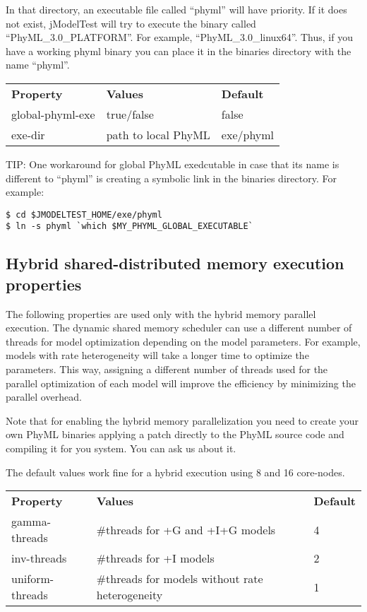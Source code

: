 In that directory, an executable file called ``phyml'' will have priority. If it does not exist, jModelTest will try to execute the binary called ``PhyML\_3.0\_PLATFORM''. For example, ``PhyML\_3.0\_linux64''. Thus, if you have a working phyml binary you can place it in the binaries directory with the name ``phyml''.

\begin{center}
\begin{tabular}{|l|l|l|}
\hline
{\bf Property} & {\bf Values} & {\bf Default} \\
global-phyml-exe & true/false &  false \\
exe-dir	         & path to local PhyML & exe/phyml \\ 
\hline
\end{tabular}
\end{center}

TIP: One workaround for global PhyML exedcutable in case that its name is different to ``phyml'' is creating a symbolic link in the binaries directory. For example:

\begin{lstlisting}
$ cd $JMODELTEST_HOME/exe/phyml
$ ln -s phyml `which $MY_PHYML_GLOBAL_EXECUTABLE`
\end{lstlisting}

\subsection{Hybrid shared-distributed memory execution properties}

The following properties are used only with the hybrid memory parallel execution. The dynamic shared memory scheduler can use a different number of threads for model optimization depending on the model parameters. For example, models with rate heterogeneity will take a longer time to optimize the parameters. This way, assigning a different number of threads used for the parallel optimization of each model will improve the efficiency by minimizing the parallel overhead.

Note that for enabling the hybrid memory parallelization you need to create your own PhyML binaries applying a patch directly to the PhyML source code and compiling it for you system. You can ask us about it.

The default values work fine for a hybrid execution using 8 and 16 core-nodes.

\begin{center}
\begin{tabular}{|l|l|l|}
\hline
{\bf Property} & {\bf Values} & {\bf Default} \\
gamma-threads  & \#threads for +G and +I+G models & 4 \\
inv-threads    & \#threads for +I models & 2 \\
uniform-threads& \#threads for models without rate heterogeneity & 1 \\
\hline
\end{tabular}
\end{center}
